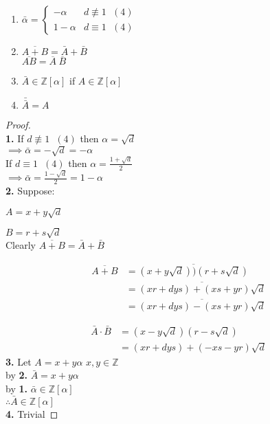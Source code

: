 \documentclass[11pt]{article}
\begin{document}
\begin{enumerate}
	\item{$\bar \alpha = 
		\begin{cases}
			-\alpha & d \not \equiv 1 \hspace{7pt} (4)  \\
			1-\alpha & d \equiv 1 \hspace{7pt} (4) 
		\end{cases}$}\\[1em]
\item{$\overline{A+B} = \bar A + \bar B  $\\
	$\overline{AB} = \overline{A}  \hspace{3pt} \overline{B}$}\\[1em]
\item{$\bar A \in \mathbb{Z}[\alpha]$ if $A \in \mathbb{Z}[\alpha]$}\\[1em]
\item{ $\bar{\bar A} = A$}
\end{enumerate}
\begin{proof} $ $\\ 
	\textbf{1.} If $d \not \equiv 1 \hspace{7pt} (4)$ then $\alpha = \sqrt{d} $\\
	\hspace{70pt} $\implies \bar \alpha = - \sqrt{d} = -\alpha $\\[2em]
	If $d \equiv 1 \hspace{7pt} (4)$ then $\alpha = \frac{1+\sqrt{d} }{2}$\\
	\hspace{60pt} $\implies \bar \alpha = \frac{1-\sqrt{d}}{2} = 1 - \alpha$ \\[1em]
	
	\textbf{2.} Suppose:

	$A= x+ y\sqrt{d}$
	
	$ B= r+s\sqrt{d} $\\[1em]

	Clearly $\overline{A+B} = \bar A + \bar B $


	\begin{align*}
		\overline{A+B} & = \overline{(x+y\sqrt{d}) )(r+s\sqrt{d})}\\
		&= \overline{(xr+dys)+ (xs+yr)\sqrt{d}}\\
		& = \overline{(xr+dys)- (xs+yr)\sqrt{d}}
	\end{align*}

	\begin{align*}
		\bar A \cdot \bar B &= (x-y\sqrt{d})(r-s\sqrt{d})\\
		&=(xr+dys)+ (-xs-yr)\sqrt{d}
	\end{align*}
	\newpage
	\textbf{3.} Let $A = x+y\alpha   $\hspace{20pt} $x,y \in \mathbb{Z}$\\[1em]
	by \textbf{2.} $\bar A = x+y\alpha$\\
	by \textbf{1.} $\bar \alpha \in \mathbb{Z}[\alpha]$\\
	$\therefore \bar A \in \mathbb{Z}[\alpha]$\\[1em]
	\textbf{4.} Trivial
\end{proof}
\end{document}
